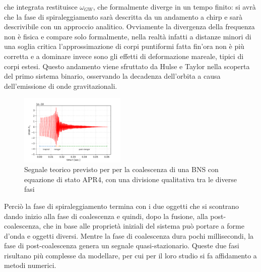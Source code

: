 che integrata restituisce $\omega_{GW}$, che formalmente diverge in un tempo finito: si avrà che la fase di spiraleggiamento sarà descritta da un andamento a chirp e sarà descrivibile con un approccio analitico. Ovviamente la divergenza della frequenza non è fisica e compare solo formalmente, nella realtà infatti a distanze minori di una soglia critica l'approssimazione di corpi puntiformi fatta fin'ora non è più corretta e a dominare invece sono gli effetti di deformazione mareale, tipici di corpi estesi. Questo andamento viene sfruttato da Hulse e Taylor nella scoperta del primo sistema binario, osservando la decadenza dell'orbita a causa dell'emissione di onde gravitazionali.
\begin{figure}
	\vspace{-10pt}
	\begin{center}
		\includegraphics[width=0.45\textwidth]{figures/Capitolo_1/APR4.pdf}
	\end{center}
	\vspace{-11pt}
	\caption{Segnale teorico previsto per per la coalescenza di una BNS con equazione di stato APR4, con una divisione qualitativa tra le diverse fasi}
	\label{fig:forma_onda_APR4}
	\vspace{-10pt}
\end{figure}
Perciò la fase di spiraleggiamento termina con i due oggetti che si scontrano dando inizio alla fase di coalescenza e quindi, dopo la fusione, alla post-coalescenza, che in base alle proprietà iniziali del sistema può portare a forme d'onda e oggetti diversi.	Mentre la fase di coalescenza dura pochi millisecondi, la fase di post-coalescenza genera un segnale quasi-stazionario. Queste due fasi risultano più complesse da modellare, per cui per il loro studio si fa affidamento a metodi numerici. \cite{maggiore2008gravitational}

